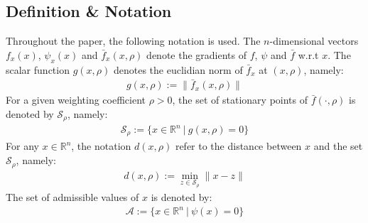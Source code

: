 \documentclass{article}
\begin{document}
\subsection{Definition \& Notation} \label{secdefnot} 
\noindent Throughout the paper, the following notation is used. The $n$-dimensional vectors $f_x(x)$, $\psi_x(x)$ and $\bar f_x(x,\rho)$ denote the gradients of $f$, $\psi$ and $\bar f$ w.r.t $x$. The scalar function $g(x,\rho)$ denotes the euclidian norm of $\bar f_x$ at $(x,\rho)$, namely:
\begin{eqnarray}
g(x,\rho):=\|\bar f_x(x,\rho)\|
\end{eqnarray} 
For a given weighting coefficient $\rho>0$, the set of stationary points of $\bar f(\cdot,\rho)$ is denoted by $\mathcal S_\rho$, namely:
\begin{eqnarray}
\mathcal S_\rho:=\bigl\{x\in \mathbb{R}^{n}\ \vert\  g(x,\rho)=0\bigr\}
\end{eqnarray} 
For any $x\in \mathbb{R}^{n}$, the notation $d(x,\rho)$ refer to the distance between $x$ and the set $\mathcal S_\rho$, namely:
\begin{eqnarray}
d(x,\rho):=\min_{z\in \mathcal S_\rho}\|x-z\|
\end{eqnarray} 
The set of admissible values of $x$ is denoted by:
\begin{eqnarray}
\mathcal A:=\bigl\{x\in \mathbb{R}^{n}\ \vert\ \psi(x)=0\bigr\}
\end{eqnarray} 
\end{document}
